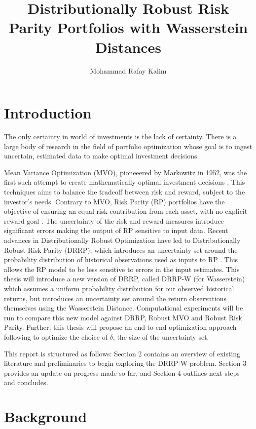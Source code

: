 \documentclass[12pt]{article}
\title{Distributionally Robust Risk Parity Portfolios with Wasserstein Distances}
\author{Mohammad Rafay Kalim }
\date{\vspace{-5ex}}
\begin{document}
\maketitle

\section{Introduction}
The only certainty in world of investments is the lack of certainty. There is a large body of research in the field of portfolio optimization whose goal is to ingest uncertain, estimated data to make optimal investment decisions. 


Mean Variance Optimization (MVO), pioneeered by Markowitz in 1952, was the first such attempt to create mathematically optimal investment decisions \cite{markowitz1952}. This techniques aims to balance the tradeoff between risk and reward, subject to the investor's needs. Contrary to MVO, Risk Parity (RP) portfolios have the objective of ensuring an equal risk contribution from each asset, with no explicit reward goal \cite{qian2011risk}.  The uncertainty of the risk and reward measures introduce significant errors making the output of RP sensitive to input data. Recent advances in Distributionally Robust Optimization have led to Distributionally Robust Risk Parity (DRRP), which introduces an uncertainty set around the probability distribution of historical observations used as inputs to RP \cite{costa2020robust}. This allows the RP model to be less sensitive to errors in the input estimates. This thesis will introduce a new version of DRRP, called DRRP-W (for Wasserstein) which assumes a uniform probability distribution for our observed historical returns, but introduces an uncertainty set around the return observations themselves using the Wasserstein Distance.  Computational experiments will be run to compare this new model against DRRP, Robust MVO and Robust Risk Parity. Further, this thesis will propose an end-to-end optimization approach following \cite{butler2023integrating} to optimize the choice of $\delta$, the size of the uncertainty set.

This report is structured as follows: Section 2 contains an overview of existing literature and preliminaries to begin exploring the DRRP-W problem. Section 3 provides an update on progress made so far, and Section 4 outlines next steps and concludes.

\section{Background}
\end{document}
